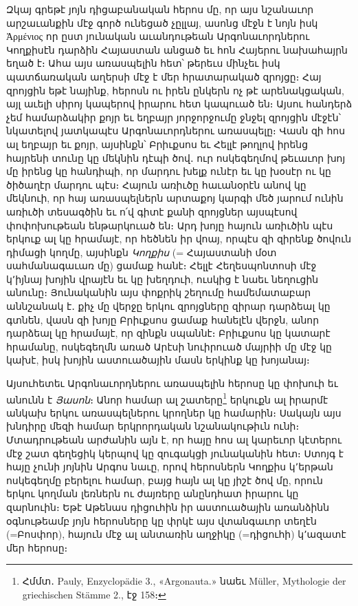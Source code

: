 \documentclass{article}
\begin{document}
{Զկայ գրեթէ յոյն դիցաբանական հերոս մը, որ այս նշանաւոր արշաւանքին մէջ գործ ունեցած չըլլայ, ասոնց մէջն է նոյն իսկ Ἀρμένιος որ ըստ յունական աւանդութեան Արգոնաւորդներու Կողքիսէն դարձին Հայաստան անցած եւ հոն Հայերու նախահայրն եղած է։ Ահա այս առասպելին հետ՝ թերեւս մինչեւ իսկ պատճառական աղերսի մէջ է մեր հրատարակած զրոյցը։ Հայ զրոյցին եթէ նայինք, հերոսն ու իրեն ընկերն ոչ թէ արենակցական, այլ աւելի սիրոյ կապերով իրարու հետ կապուած են։ Այսու հանդերձ չեմ համարձակիր քոյր եւ եղբայր յորջորջումը ջնջել զրոյցին մէջէն՝ նկատելով յատկապէս Արգոնաւորդներու առասպելը։ Վասն զի հոս ալ եղբայր եւ քոյր, այսինքն՝ Բրիւքսոս եւ Հելլէ թողլով իրենց հայրենի տունը կը մեկնին դէպի ծով․ ուր ոսկեգեղմով թեւաւոր խոյ մը իրենց կը հանդիպի, որ մարդու խելք ունէր եւ կը խօսէր ու կը ծիծաղէր մարդու պէս։ Հայուն առիւծը հաւանօրէն անով կը մեկնուի, որ հայ առասպելներն արտաքոյ կարգի մեծ յարում ունին առիւծի տեսագծին եւ ո՛վ գիտէ քանի զրոյցներ այսպէսով փոփոխութեան ենթարկուած են։ Արդ խոյը հայուն առիւծին պէս երկուք ալ կը հրամայէ, որ հեծնեն իր վոայ, որպէս զի զիրենք ծովուն դիմացի կողմը, այսինքն \emph{Կողքիս} (= Հայաստանի մօտ սահմանագաւառ մը) ցամաք հանէ։ Հելլէ Հեղեսպոնտոսի մէջ կ՚իյնայ խոյին վրայէն եւ կը խեղդուի, ուսկից է նաեւ նեղուցին անունը։ Յունականին այս փոքրիկ շեղումը համեմատաբար աննշանակ է․ քիչ մը վերջը երկու զրոյցները զիրար դարձեալ կը գտնեն, վասն զի խոյը Բրիւքսոս ցամաք հանելէն վերջն, անոր դարձեալ կը հրամայէ, որ զինքն սպաննէ։ Բրիւքսոս կը կատարէ հրամանը, ոսկեգեղմն առած Արէսի նուիրուած մայրիի մը մէջ կը կախէ, իսկ խոյին աստուածային մասն երկինք կը խոյանայ։

Այսուհետեւ Արգոնաւորդներու առասպելին հերոսը կը փոխուի եւ անունն է \emph{Յասոն}։ Անոր համար ալ շատերը\footnote{Հմմտ․ Pauly, Enzyclopädie 3., «Argonauta.» նաեւ Müller, Mythologie der griechischen Stämme 2., էջ 158։} երկուքն ալ իրարմէ անկախ երկու առասպելներու կրողներ կը համարին։ Սակայն այս խնդիրը մեզի համար երկրորդական նշանակութիւն ունի։ Մտադրութեան արժանին այն է, որ հայը հոս ալ կարեւոր կէտերու մէջ շատ գեղեցիկ կերպով կը զուգակցի յունականին հետ։ Ստոյգ է հայը չունի յոյնին Արգոս նաւը, որով հերոսներն Կողքիս կ՚երթան ոսկեգեղմը բերելու համար, բայց հայն ալ կը յիշէ ծով մը, որուն երկու կողման լեռներն ու ժայռերը անընդհատ իրարու կը զարնուին։ Եթէ Աթենաս դիցուհին իր աստուածային առանձինն օգնութեամբ յոյն հերոսները կը փրկէ այս վտանգաւոր տեղէն (=Բոսփոր), հայուն մէջ ալ անտառին աղջիկը (=դիցուհի) կ՚ազատէ մեր հերոսը։

}
\end{document}

